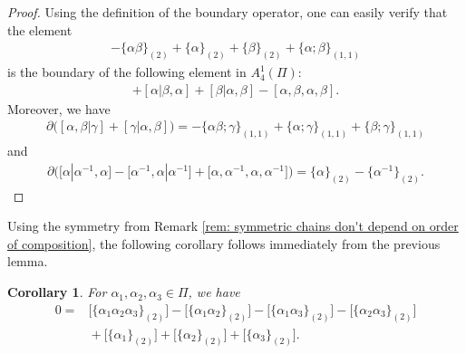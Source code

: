 \documentclass[pdftex]{sigma}
\numberwithin{equation}{section}
\newtheorem{Corollary}[Theorem]{Corollary}
\begin{document}
\begin{proof}
 Using the definition of the boundary operator, one can easily verify that the element
 \begin{align*}
 -\{\alpha\beta\}_{(2)}+\{\alpha\}_{(2)}+\{\beta\}_{(2)}+\{\alpha;\beta\}_{(1,1)}
 \end{align*}
 is the boundary of the following element in $A_{4}^1(\Pi)$:
 \begin{align*}
 [\alpha,\beta|\alpha\beta]+[\alpha|\beta,\alpha]+[\beta|\alpha,\beta]-[\alpha,\beta,\alpha,\beta].
 \end{align*}
 Moreover, we have
 \begin{align*}
 \partial\big([\alpha,\beta|\gamma]+[\gamma|\alpha,\beta]\big)= -\{\alpha\beta;\gamma\}_{(1,1)}+ \{\alpha;\gamma\}_{(1,1)}+\{\beta;\gamma\}_{(1,1)}
 \end{align*}
 and
 \begin{align*}
 \partial\big( \big[\alpha|\alpha^{-1},\alpha\big]-\big[\alpha^{-1},\alpha|\alpha^{-1}\big]+\big[\alpha,\alpha^{-1},\alpha,\alpha^{-1}\big] \big)=\{\alpha\}_{(2)}-\big\{\alpha^{-1}\big\}_{(2)}.\tag*{\qed}
 \end{align*}
\renewcommand{\qed}{}\end{proof}

Using the symmetry from Remark \ref{rem: symmetric chains don't depend on order of composition}, the following corollary follows immediately from the previous lemma.

\begin{Corollary}\label{cor: n-form for d=1}
 For $\alpha_1,\alpha_2,\alpha_3 \in \Pi$, we have
 \begin{align*}
 0={}&\big[\{\alpha_1\alpha_2\alpha_3\}_{(2)} \big]- \big[\{\alpha_1\alpha_2\}_{(2)} \big]-\big[\{\alpha_1\alpha_3\}_{(2)} \big]-\big[\{\alpha_2\alpha_3\}_{(2)} \big]\\
 &{}+\big[\{\alpha_1\}_{(2)} \big]+\big[\{\alpha_2\}_{(2)} \big]+\big[\{\alpha_3\}_{(2)} \big].
 \end{align*}
\end{Corollary}
\end{document}
